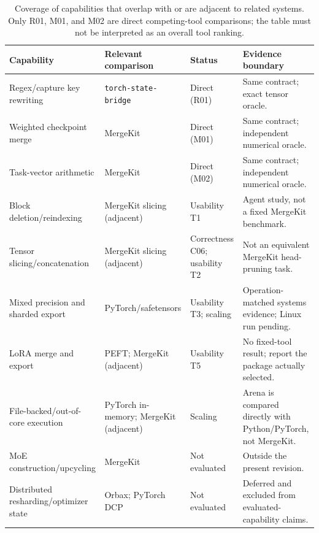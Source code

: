 \begin{table}[t]
  \centering
  \small
  \begin{tabular}{@{}p{}p{}p{}p{}@{}}
    \toprule
    Capability & Relevant comparison & Status & Evidence boundary \\
    \midrule
    Regex/capture key rewriting
      & \texttt{torch-state-bridge}
      & Direct (R01)
      & Same contract; exact tensor oracle. \\
    Weighted checkpoint merge
      & MergeKit
      & Direct (M01)
      & Same contract; independent numerical oracle. \\
    Task-vector arithmetic
      & MergeKit
      & Direct (M02)
      & Same contract; independent numerical oracle. \\
    Block deletion/reindexing
      & MergeKit slicing (adjacent)
      & Usability T1
      & Agent study, not a fixed MergeKit benchmark. \\
    Tensor slicing/concatenation
      & MergeKit slicing (adjacent)
      & Correctness C06; usability T2
      & Not an equivalent MergeKit head-pruning task. \\
    Mixed precision and sharded export
      & PyTorch/safetensors
      & Usability T3; scaling
      & Operation-matched systems evidence; Linux run pending. \\
    LoRA merge and export
      & PEFT; MergeKit (adjacent)
      & Usability T5
      & No fixed-tool result; report the package actually selected. \\
    File-backed/out-of-core execution
      & PyTorch in-memory; MergeKit (adjacent)
      & Scaling
      & Arena is compared directly with Python/PyTorch, not MergeKit. \\
    MoE construction/upcycling
      & MergeKit
      & Not evaluated
      & Outside the present revision. \\
    Distributed resharding/optimizer state
      & Orbax; PyTorch DCP
      & Not evaluated
      & Deferred and excluded from evaluated-capability claims. \\
    \bottomrule
  \end{tabular}
  \caption{Coverage of capabilities that overlap with or are adjacent to related systems. Only R01, M01, and M02 are direct competing-tool comparisons; the table must not be interpreted as an overall tool ranking.}
  \label{tab:related-system-feature-coverage}
\end{table}
